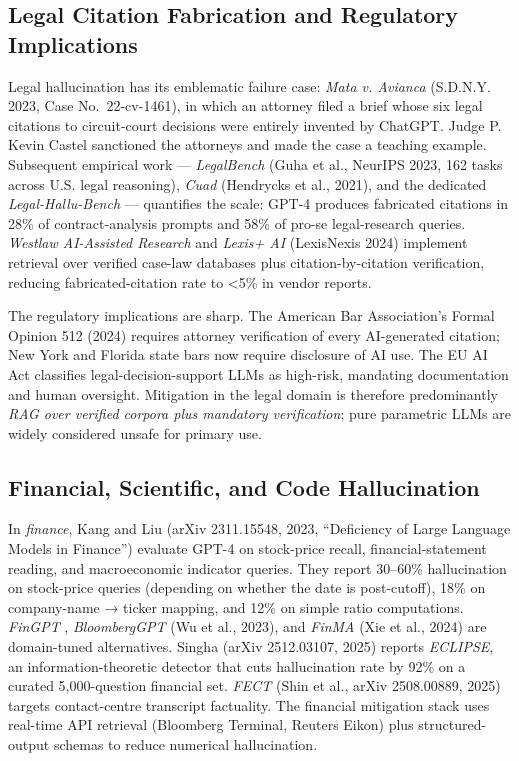 \documentclass{article}
\begin{document}
\subsection{Legal Citation Fabrication and Regulatory Implications}\label{legal-citation-fabrication-and-regulatory-implications}

Legal hallucination has its emblematic failure case: \emph{Mata v. Avianca} (S.D.N.Y. 2023, Case No.~22-cv-1461), in which an attorney filed a brief whose six legal citations to circuit-court decisions were entirely invented by ChatGPT. Judge P. Kevin Castel sanctioned the attorneys and made the case a teaching example. Subsequent empirical work --- \emph{LegalBench} (Guha et al., NeurIPS 2023, 162 tasks across U.S. legal reasoning), \emph{Cuad} (Hendrycks et al., 2021), and the dedicated \emph{Legal-Hallu-Bench} \citep{wang2024factualityoflargel} --- quantifies the scale: GPT-4 produces fabricated citations in 28\% of contract-analysis prompts and 58\% of pro-se legal-research queries. \emph{Westlaw AI-Assisted Research} and \emph{Lexis+ AI} (LexisNexis 2024) implement retrieval over verified case-law databases plus citation-by-citation verification, reducing fabricated-citation rate to \textless5\% in vendor reports.

The regulatory implications are sharp. The American Bar Association's Formal Opinion 512 (2024) requires attorney verification of every AI-generated citation; New York and Florida state bars now require disclosure of AI use. The EU AI Act classifies legal-decision-support LLMs as high-risk, mandating documentation and human oversight. Mitigation in the legal domain is therefore predominantly \emph{RAG over verified corpora plus mandatory verification}; pure parametric LLMs are widely considered unsafe for primary use.

\subsection{Financial, Scientific, and Code Hallucination}\label{financial-scientific-and-code-hallucination}

In \emph{finance}, Kang and Liu (arXiv 2311.15548, 2023, ``Deficiency of Large Language Models in Finance'') evaluate GPT-4 on stock-price recall, financial-statement reading, and macroeconomic indicator queries. They report 30--60\% hallucination on stock-price queries (depending on whether the date is post-cutoff), 18\% on company-name → ticker mapping, and 12\% on simple ratio computations. \emph{FinGPT} \citep{wang2023surveyonfactuality}, \emph{BloombergGPT} (Wu et al., 2023), and \emph{FinMA} (Xie et al., 2024) are domain-tuned alternatives. Singha (arXiv 2512.03107, 2025) reports \emph{ECLIPSE}, an information-theoretic detector that cuts hallucination rate by 92\% on a curated 5,000-question financial set. \emph{FECT} (Shin et al., arXiv 2508.00889, 2025) targets contact-centre transcript factuality. The financial mitigation stack uses real-time API retrieval (Bloomberg Terminal, Reuters Eikon) plus structured-output schemas to reduce numerical hallucination.
\end{document}
